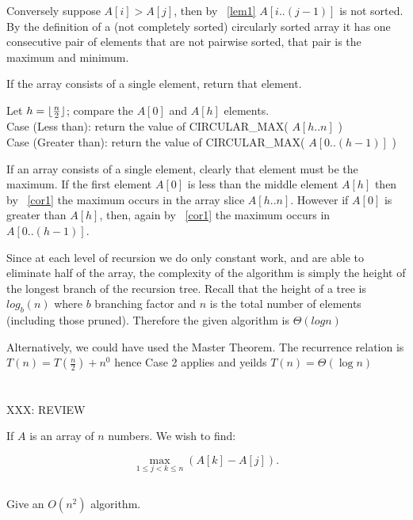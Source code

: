 \documentclass{amsart}
\theoremstyle{definition}
\theoremstyle{remark}
\numberwithin{equation}{section}
\DeclarePairedDelimiter{\floor}{\lfloor}{\rfloor}
\begin{document}
Conversely suppose $A[i] > A[j]$, then by ~\ref{lem1} $A[i..(j-1)]$ is
not sorted. By the definition of a (not completely sorted) circularly
sorted array it has one consecutive pair of elements that are not
pairwise sorted, that pair is the maximum and minimum.


If the array consists of a single element, return that element.

Let $h = \floor{ \frac{n}{2} }$; compare the $A[0]$ and $A[h]$ elements. \\

Case (Less than): return the value of CIRCULAR\_MAX( $A[h..n]$ ) \\

Case (Greater than): return the value of CIRCULAR\_MAX( $A[0..(h-1)]$ ) \\

\proof

If an array consists of a single element, clearly that element must
be the maximum. If the first element $A[0]$ is less than the middle
element $A[h]$ then by ~\ref{cor1} the maximum occurs in the array slice
$A[h..n]$. However if $A[0]$ is greater than $A[h]$, then, again by
~\ref{cor1} the maximum occurs in $A[0..(h-1)]$.


\proof

Since at each level of recursion we do only constant work, and are able
to eliminate half of the array, the complexity of the algorithm is
simply the height of the longest branch of the recursion tree. Recall
that the height of a tree is $log_{b} (n)$ where $b$ branching factor
and $n$ is the total number of elements (including those pruned).
Therefore the given algorithm is $\Theta( log n )$

Alternatively, we could have used the Master Theorem. The recurrence
relation is $T(n) = T(\frac{n}{2}) + n^0$ hence Case 2 applies and
yeilds $T(n) = \Theta (\log n)$
\\


\section{}
XXX: REVIEW

If $A$ is an array of $n$ numbers. We wish to find:

$$ \max_{1 \leq j<k \leq n} (A[k] - A[j]).$$

\subsection{} Give an $O( n^2 )$ algorithm.
\end{document}
